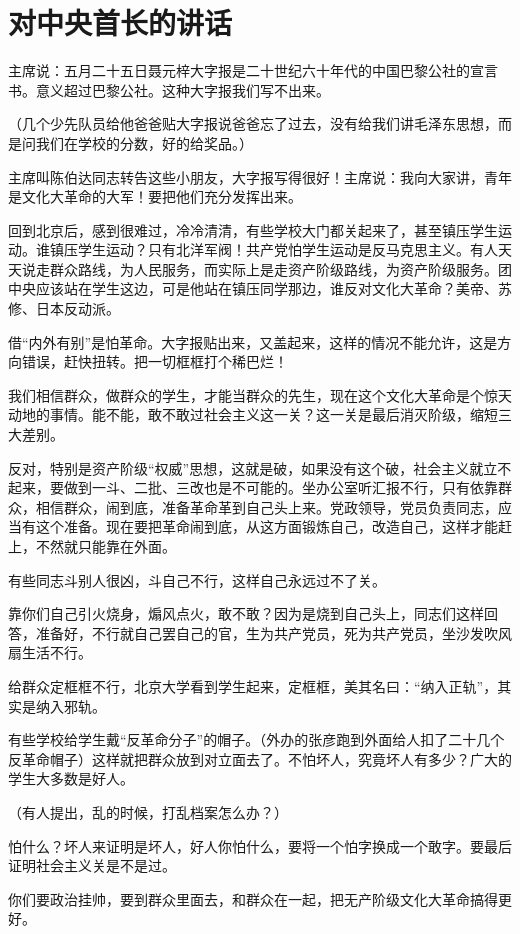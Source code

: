 \section[对中央首长的讲话（一九六六年七月）]{对中央首长的讲话}


主席说：五月二十五日聂元梓大字报是二十世纪六十年代的中国巴黎公社的宣言书。意义超过巴黎公社。这种大字报我们写不出来。

（几个少先队员给他爸爸贴大字报说爸爸忘了过去，没有给我们讲毛泽东思想，而是问我们在学校的分数，好的给奖品。）

主席叫陈伯达同志转告这些小朋友，大字报写得很好！主席说：我向大家讲，青年是文化大革命的大军！要把他们充分发挥出来。

回到北京后，感到很难过，冷冷清清，有些学校大门都关起来了，甚至镇压学生运动。谁镇压学生运动？只有北洋军阀！共产党怕学生运动是反马克思主义。有人天天说走群众路线，为人民服务，而实际上是走资产阶级路线，为资产阶级服务。团中央应该站在学生这边，可是他站在镇压同学那边，谁反对文化大革命？美帝、苏修、日本反动派。

借“内外有别”是怕革命。大字报贴出来，又盖起来，这样的情况不能允许，这是方向错误，赶快扭转。把一切框框打个稀巴烂！

我们相信群众，做群众的学生，才能当群众的先生，现在这个文化大革命是个惊天动地的事情。能不能，敢不敢过社会主义这一关？这一关是最后消灭阶级，缩短三大差别。

反对，特别是资产阶级“权威”思想，这就是破，如果没有这个破，社会主义就立不起来，要做到一斗、二批、三改也是不可能的。坐办公室听汇报不行，只有依靠群众，相信群众，闹到底，准备革命革到自己头上来。党政领导，党员负责同志，应当有这个准备。现在要把革命闹到底，从这方面锻炼自己，改造自己，这样才能赶上，不然就只能靠在外面。

有些同志斗别人很凶，斗自己不行，这样自己永远过不了关。

靠你们自己引火烧身，煽风点火，敢不敢？因为是烧到自己头上，同志们这样回答，准备好，不行就自己罢自己的官，生为共产党员，死为共产党员，坐沙发吹风扇生活不行。

给群众定框框不行，北京大学看到学生起来，定框框，美其名曰：“纳入正轨”，其实是纳入邪轨。

有些学校给学生戴“反革命分子”的帽子。（外办的张彦跑到外面给人扣了二十几个反革命帽子）这样就把群众放到对立面去了。不怕坏人，究竟坏人有多少？广大的学生大多数是好人。

（有人提出，乱的时候，打乱档案怎么办？）

怕什么？坏人来证明是坏人，好人你怕什么，要将一个怕字换成一个敢字。要最后证明社会主义关是不是过。

你们要政治挂帅，要到群众里面去，和群众在一起，把无产阶级文化大革命搞得更好。



